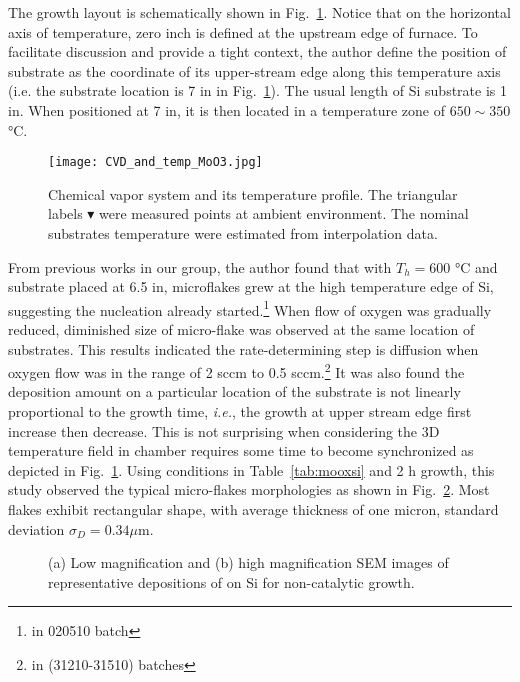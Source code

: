 The growth layout is schematically shown in Fig.~\ref{fig:mooxgrowth}. Notice that on the horizontal axis of temperature, zero inch is defined at the upstream edge of furnace. To facilitate discussion and provide a tight context, the author define the position of substrate as the coordinate of its upper-stream edge along this temperature axis (i.e. the substrate location is 7 in in Fig.~\ref{fig:mooxgrowth}). The usual length of Si substrate is 1 in. When positioned at 7 in, it is then located in a temperature zone of $650 \sim 350$ \si{\degreeCelsius}.
\begin{figure}[htb]
\centering
\texttt{[image: CVD\_and\_temp\_MoO3.jpg]}
\caption[Growth setup of ]{Chemical vapor system and its temperature profile. The triangular labels $\blacktriangledown$ were measured points at ambient environment. The nominal substrates temperature were estimated from interpolation data.}
\label{fig:mooxgrowth}
\end{figure}

From previous works in our group,\cite{predeep2011} the author found that with $T_h = 600$ \si{\degreeCelsius} and substrate placed at 6.5 in, microflakes grew at the high temperature edge of Si, suggesting the nucleation already started.\footnote{in 020510 batch} When flow of oxygen was gradually reduced, diminished size of micro-flake was observed at the same location of substrates. This results indicated the rate-determining step is diffusion when oxygen flow was in the range of 2 sccm to 0.5 sccm.\footnote{in (31210-31510) batches} It was also found the deposition amount on a particular location of the substrate is not linearly proportional to the growth time, \emph{i.e.}, the growth at upper stream edge first increase then decrease. This is not surprising when considering the 3D temperature field in chamber requires some time to become synchronized as depicted in Fig.~\ref{fig:mooxgrowth}. Using conditions in Table~\ref{tab:mooxsi} and 2 h growth, this study observed the typical micro-flakes morphologies as shown in Fig.~\ref{fig:mosisem}. Most flakes exhibit rectangular shape, with average thickness of one micron, standard deviation $\sigma_D=0.34 \mu$m.
\begin{figure}[htb]
\centering
{}\hspace{0.04\textwidth}
\caption[Representative morphologies of  on Si]{(a) Low magnification and (b) high magnification SEM images of representative depositions of  on Si for non-catalytic growth.}
\label{fig:mosisem}
\end{figure}

